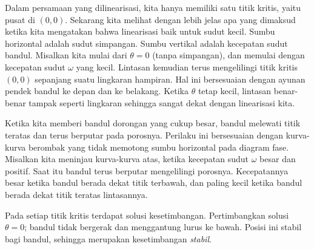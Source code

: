 \begin{myfig}
\capstart
{}
\caption{Diagram bidang fase dan beberapa lintasan persamaan
bandul nonlinear. \label{fig:nlin-pend-phasediag}}
\end{myfig}

Dalam persamaan yang dilinearisasi, kita hanya memiliki satu titik kritis,
yaitu pusat di $(0,0)$. Sekarang kita melihat dengan lebih jelas apa yang
dimaksud ketika kita mengatakan bahwa linearisasi baik untuk sudut kecil.
Sumbu horizontal adalah sudut simpangan. Sumbu vertikal adalah kecepatan
sudut bandul. Misalkan kita mulai dari $\theta = 0$ (tanpa simpangan), dan
memulai dengan kecepatan sudut $\omega$ yang kecil. Lintasan kemudian terus
mengelilingi titik kritis $(0,0)$ sepanjang suatu lingkaran hampiran. Hal ini bersesuaian
dengan ayunan pendek bandul ke depan dan ke belakang. Ketika $\theta$ tetap
kecil, lintasan benar-benar tampak seperti lingkaran sehingga sangat dekat
dengan linearisasi kita.

Ketika kita memberi bandul dorongan yang cukup besar, bandul melewati titik
teratas dan terus berputar pada porosnya. Perilaku ini bersesuaian dengan
kurva-kurva berombak yang tidak memotong sumbu horizontal pada diagram fase.
Misalkan kita meninjau kurva-kurva atas, ketika kecepatan sudut $\omega$
besar dan positif. Saat itu bandul terus berputar mengelilingi porosnya.
Kecepatannya besar ketika bandul berada dekat titik terbawah, dan paling kecil
ketika bandul berada dekat titik teratas lintasannya.

Pada setiap titik kritis terdapat solusi kesetimbangan. Pertimbangkan solusi
$\theta = 0$; bandul tidak bergerak dan menggantung lurus ke bawah. Posisi
ini stabil bagi bandul, sehingga merupakan kesetimbangan \emph{stabil}.

